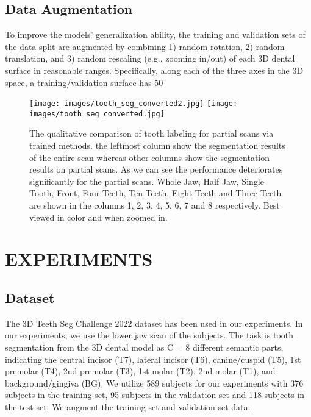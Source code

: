 \documentclass[letterpaper, 10 pt, conference]{ieeeconf}  %
\begin{document}
\subsection{Data Augmentation}
To improve the models' generalization ability, the training and validation sets of the data split are augmented by combining 1) random rotation, 2) random translation, and
3) random rescaling (e.g., zooming in/out) of each 3D dental surface in reasonable ranges. Specifically, along each of the three axes in the 3D space, a training/validation surface has 50%
\begin{figure*}[htbp]
\texttt{[image: images/tooth\_seg\_converted2.jpg]}
\texttt{[image: images/tooth\_seg\_converted.jpg]}
\caption{\small  The qualitative comparison of tooth labeling for partial scans via trained methods. the leftmost column show the segmentation results of the entire scan whereas other columns show the segmentation results on partial scans. As we can see the performance deteriorates significantly for the partial scans. Whole Jaw, Half Jaw, Single Tooth, Front, Four Teeth, Ten Teeth, Eight Teeth and Three Teeth  are shown in the columns 1, 2, 3, 4, 5, 6, 7 and 8 respectively. Best viewed in color and when zoomed in.}
\label{fig:compareSingleTooth1}
\end{figure*}
\section{EXPERIMENTS}
\subsection{Dataset} The 3D Teeth Seg Challenge 2022 dataset\cite{ben2022teeth3ds} has been used in our experiments. 
In our experiments, we use the lower jaw scan of the subjects.
The task is tooth segmentation from the 3D dental model as C = 8 different semantic parts, indicating the central incisor (T7), lateral incisor (T6), canine/cuspid (T5), 1st premolar (T4), 2nd premolar (T3), 1st molar (T2), 2nd molar (T1), and background/gingiva (BG). 
We utilize 589 subjects for our experiments with  376 subjects in the training set, 95 subjects in the validation set and 118 subjects in the test set. We augment the training set and validation set data. 
\end{document}
